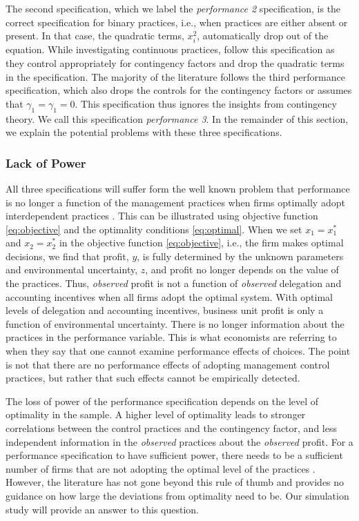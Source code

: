 \documentclass[12pt]{article}
\begin{document}
The second specification, which we label the \emph{performance 2} specification, is the correct specification for binary practices, i.e., when practices are either absent or present. In that case, the quadratic terms, $x_i^2$, automatically drop out of the equation. While investigating continuous practices, \citet{ bedford_management_2016, bedford_performance_2019} follow this specification as they control appropriately for contingency factors and drop the quadratic terms in the specification. The majority of the literature follows the third performance specification, which also drops the controls for the contingency factors or assumes that $\gamma_1 = \gamma_1 = 0$. This specification thus ignores the insights from contingency theory. We call this specification \emph{performance 3}. In the remainder of this section, we explain the potential problems with these three specifications.

\subsubsection{Lack of Power}

All three specifications will suffer form the well known problem that performance is no longer a function of the management practices when firms optimally adopt interdependent practices \citep{grabner_management_2013}. This can be illustrated using objective function \eqref{eq:objective} and the optimality conditions \eqref{eq:optimal}. When we set $x_1 = x_1^*$ and $x_2 = x_2^*$ in the objective function  \eqref{eq:objective}, i.e., the firm makes optimal decisions, we find that profit, $y$, is fully determined by the unknown parameters and environmental uncertainty, $z$, and profit no longer depends on the value of the practices. Thus, \textit{observed} profit is not a function of \textit{observed} delegation and accounting incentives when all firms adopt the optimal system. With optimal levels of delegation and accounting incentives, business unit profit is only a function of environmental uncertainty. There is no longer information about the practices in the performance variable. This is what economists are referring to when they say that one cannot examine performance effects of choices. The point is not that there are no performance effects of adopting management control practices, but rather that such effects cannot be empirically detected. 

The loss of power of the performance specification depends on the level of optimality in the sample. A higher level of optimality leads to stronger  correlations between the control practices and the contingency factor, and less independent information in the \textit{observed} practices about the \textit{observed} profit. For a performance specification to have sufficient power, there needs to be a sufficient number of firms that are not adopting the optimal level of the practices \citep{bedford_management_2016, carree_note_2011, hofmann_organizational_2017}. However, the literature has not gone beyond this rule of thumb and provides no guidance on how large the deviations from optimality need to be. Our simulation study will provide an answer to this question.
\end{document}

